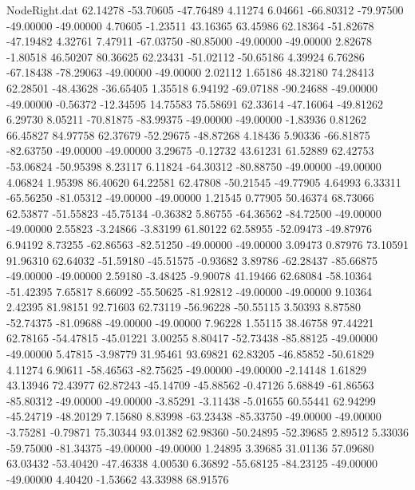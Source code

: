 \begin{filecontents}{NodeRight.dat}
  62.14278  -53.70605  -47.76489     4.11274    6.04661  -66.80312  -79.97500  -49.00000  -49.00000    4.70605   -1.23511   43.16365   63.45986
  62.18364  -51.82678  -47.19482     4.32761    7.47911  -67.03750  -80.85000  -49.00000  -49.00000    2.82678   -1.80518   46.50207   80.36625
  62.23431  -51.02112  -50.65186     4.39924    6.76286  -67.18438  -78.29063  -49.00000  -49.00000    2.02112    1.65186   48.32180   74.28413
  62.28501  -48.43628  -36.65405     1.35518    6.94192  -69.07188  -90.24688  -49.00000  -49.00000   -0.56372  -12.34595   14.75583   75.58691
  62.33614  -47.16064  -49.81262     6.29730    8.05211  -70.81875  -83.99375  -49.00000  -49.00000   -1.83936    0.81262   66.45827   84.97758
  62.37679  -52.29675  -48.87268     4.18436    5.90336  -66.81875  -82.63750  -49.00000  -49.00000    3.29675   -0.12732   43.61231   61.52889
  62.42753  -53.06824  -50.95398     8.23117    6.11824  -64.30312  -80.88750  -49.00000  -49.00000    4.06824    1.95398   86.40620   64.22581
  62.47808  -50.21545  -49.77905     4.64993    6.33311  -65.56250  -81.05312  -49.00000  -49.00000    1.21545    0.77905   50.46374   68.73066
  62.53877  -51.55823  -45.75134    -0.36382    5.86755  -64.36562  -84.72500  -49.00000  -49.00000    2.55823   -3.24866   -3.83199   61.80122
  62.58955  -52.09473  -49.87976     6.94192    8.73255  -62.86563  -82.51250  -49.00000  -49.00000    3.09473    0.87976   73.10591   91.96310
  62.64032  -51.59180  -45.51575    -0.93682    3.89786  -62.28437  -85.66875  -49.00000  -49.00000    2.59180   -3.48425   -9.90078   41.19466
  62.68084  -58.10364  -51.42395     7.65817    8.66092  -55.50625  -81.92812  -49.00000  -49.00000    9.10364    2.42395   81.98151   92.71603
  62.73119  -56.96228  -50.55115     3.50393    8.87580  -52.74375  -81.09688  -49.00000  -49.00000    7.96228    1.55115   38.46758   97.44221
  62.78165  -54.47815  -45.01221     3.00255    8.80417  -52.73438  -85.88125  -49.00000  -49.00000    5.47815   -3.98779   31.95461   93.69821
  62.83205  -46.85852  -50.61829     4.11274    6.90611  -58.46563  -82.75625  -49.00000  -49.00000   -2.14148    1.61829   43.13946   72.43977
  62.87243  -45.14709  -45.88562    -0.47126    5.68849  -61.86563  -85.80312  -49.00000  -49.00000   -3.85291   -3.11438   -5.01655   60.55441
  62.94299  -45.24719  -48.20129     7.15680    8.83998  -63.23438  -85.33750  -49.00000  -49.00000   -3.75281   -0.79871   75.30344   93.01382
  62.98360  -50.24895  -52.39685     2.89512    5.33036  -59.75000  -81.34375  -49.00000  -49.00000    1.24895    3.39685   31.01136   57.09680
  63.03432  -53.40420  -47.46338     4.00530    6.36892  -55.68125  -84.23125  -49.00000  -49.00000    4.40420   -1.53662   43.33988   68.91576

\end{filecontents}
